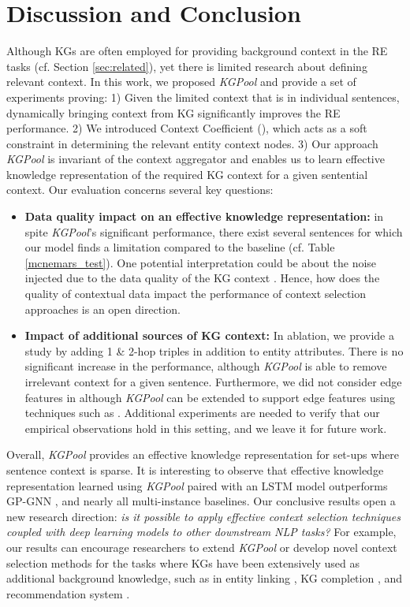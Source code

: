 \documentclass[11pt,a4paper]{article}
\begin{document}
\section{Discussion and Conclusion} \label{sec:conclusion}
Although KGs are often employed for providing background context in the RE tasks (cf. Section \ref{sec:related}), yet there is limited research about defining relevant context.
In this work, we proposed \textit{KGPool} and provide a set of experiments proving: 1) Given the limited context that is in individual sentences, dynamically bringing context from KG significantly improves the RE performance.
2) We introduced Context Coefficient (), which acts as a soft constraint in determining the relevant entity context nodes.
3) Our approach \textit{KGPool} is invariant of the context aggregator and enables us to learn effective knowledge representation of the required KG context for a given sentential context.
Our evaluation concerns several key questions:
\begin{itemize}
\vspace{-2mm}
  \item \textbf{Data quality impact on an effective knowledge representation:} in spite \textit{KGPool}'s significant performance, there exist several sentences for which our model finds a limitation compared to the baseline (cf. Table \ref{mcnemars_test}). One potential interpretation could be about the noise injected due to the data quality of the KG context \cite{weichselbraun2018mining}. Hence, how does the quality of contextual data impact the performance of context selection approaches is an open direction.
  \item \textbf{Impact of additional sources of KG context:} In ablation, we provide a study by adding 1 \& 2-hop triples in addition to entity attributes. There is no significant increase in the performance, although \textit{KGPool} is able to remove irrelevant context for a given sentence. Furthermore, we did not consider edge features in  although \textit{KGPool} can be extended to support edge features using techniques such as \cite{DBLP:conf/cvpr/SimonovskyK17}. Additional experiments are needed to verify that our empirical observations hold in this setting, and we leave it for future work.
\end{itemize}

Overall, \textit{KGPool} provides an effective knowledge representation for set-ups where sentence context is sparse. It is interesting to observe that effective knowledge representation learned using \textit{KGPool} paired with an LSTM model outperforms GP-GNN \cite{DBLP:conf/acl/ZhuLLFCS19}, and nearly all multi-instance baselines. Our conclusive results open a new research direction: \textit{is it possible to apply effective context selection techniques coupled with deep learning models to other downstream NLP tasks?} For example, our results can encourage researchers to extend \textit{KGPool} or develop novel context selection methods for the tasks where KGs have been extensively used as additional background knowledge, such as in entity linking \cite{mulang2020evaluating,mulang2020encoding}, KG completion \cite{wang2020entity,shi2017knowledge}, and recommendation system \cite{yang2020contextualized}. 
\end{document}
